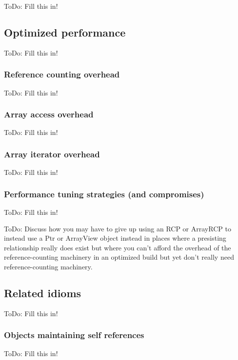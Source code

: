 \documentclass[pdf,ps2pdf,11pt]{SANDreport}
\begin{document}
ToDo: Fill this in!


%
{}\subsection{Optimized performance}
%

ToDo: Fill this in!


%
{}\subsubsection{Reference counting overhead}
%

ToDo: Fill this in!


%
{}\subsubsection{Array access overhead}
%

ToDo: Fill this in!


%
{}\subsubsection{Array iterator overhead}
%

ToDo: Fill this in!


%
{}\subsubsection{Performance tuning strategies (and compromises)}
%

ToDo: Fill this in!

ToDo: Discuss how you may have to give up using an RCP or ArrayRCP to
instead use a Ptr or ArrayView object instead in places where a
presisting relationship really does exist but where you can't afford
the overhead of the reference-counting machinery in an optimized build
but yet don't really need reference-counting machinery.


%
{}\subsection{Related idioms}
%

ToDo: Fill this in!


%
{}\subsubsection{Objects maintaining self references}
%

ToDo: Fill this in!
\end{document}
